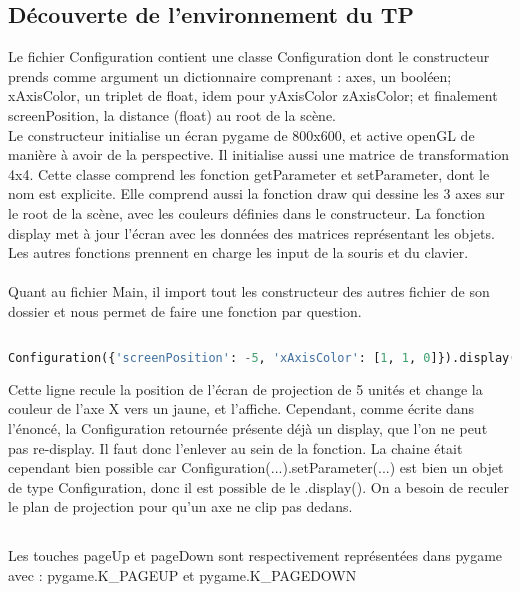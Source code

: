 \documentclass{article}
\begin{document}
\subsection*{Découverte de l'environnement du TP}
\setcounter{section}{1}
\setcounter{subsection}{0}
Le fichier Configuration contient une classe Configuration dont le constructeur prends
comme argument un dictionnaire comprenant : axes, un booléen; xAxisColor, un triplet
de float, idem pour yAxisColor zAxisColor; et finalement screenPosition,
la distance (float) au root de la scène.\\
Le constructeur initialise un écran pygame de 800x600, et active openGL de manière à avoir de la perspective. Il initialise aussi une matrice de transformation 4x4.
Cette classe comprend les fonction getParameter et setParameter, dont le nom est explicite. 
Elle comprend aussi la fonction draw qui dessine les 3 axes sur le root de la scène, avec les couleurs définies dans le constructeur.
La fonction display met à jour l'écran avec les données des matrices représentant les objets. 
Les autres fonctions prennent en charge les input de la souris et du clavier.\\
\\
Quant au fichier Main, il import tout les constructeur des autres fichier de son dossier et nous permet de faire une fonction par question. 

\subsection{}
\begin{lstlisting}[language=Python]
Configuration({'screenPosition': -5, 'xAxisColor': [1, 1, 0]}).display()
\end{lstlisting}
Cette ligne recule la position de l'écran de projection de 5 unités et change la couleur de l'axe X vers un jaune, et l'affiche. Cependant, comme écrite dans l'énoncé, la Configuration retournée présente déjà un display, que l'on ne peut pas re-display. Il faut donc l'enlever au sein de la fonction.
La chaine était cependant bien possible car Configuration(...).setParameter(...) est bien un objet de type Configuration, donc il est possible de le .display(). On a besoin de reculer le plan de projection pour qu'un axe ne clip pas dedans.

\subsection{}
Les touches pageUp et pageDown sont respectivement représentées dans pygame avec : pygame.K\_PAGEUP et pygame.K\_PAGEDOWN
\end{document}
